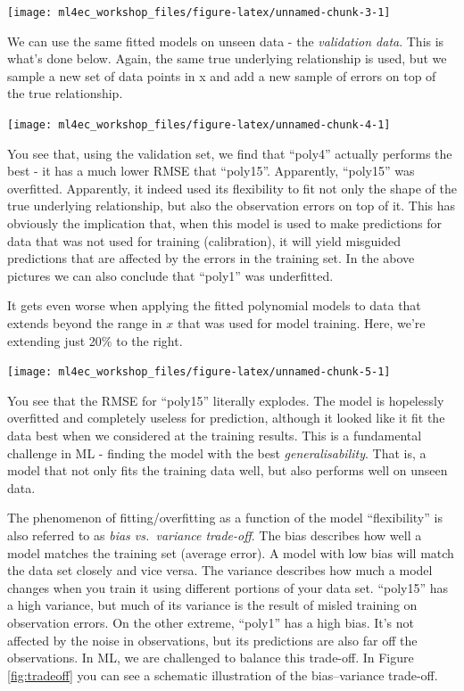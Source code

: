 \documentclass[
]{book}
\begin{document}
\begin{center}\texttt{[image: ml4ec\_workshop\_files/figure-latex/unnamed-chunk-3-1]} \end{center}

We can use the same fitted models on unseen data - the \emph{validation data}. This is what's done below. Again, the same true underlying relationship is used, but we sample a new set of data points in x and add a new sample of errors on top of the true relationship.

\begin{center}\texttt{[image: ml4ec\_workshop\_files/figure-latex/unnamed-chunk-4-1]} \end{center}

You see that, using the validation set, we find that ``poly4'' actually performs the best - it has a much lower RMSE that ``poly15''. Apparently, ``poly15'' was overfitted. Apparently, it indeed used its flexibility to fit not only the shape of the true underlying relationship, but also the observation errors on top of it. This has obviously the implication that, when this model is used to make predictions for data that was not used for training (calibration), it will yield misguided predictions that are affected by the errors in the training set. In the above pictures we can also conclude that ``poly1'' was underfitted.

It gets even worse when applying the fitted polynomial models to data that extends beyond the range in \(x\) that was used for model training. Here, we're extending just 20\% to the right.

\begin{center}\texttt{[image: ml4ec\_workshop\_files/figure-latex/unnamed-chunk-5-1]} \end{center}

You see that the RMSE for ``poly15'' literally explodes. The model is hopelessly overfitted and completely useless for prediction, although it looked like it fit the data best when we considered at the training results. This is a fundamental challenge in ML - finding the model with the best \emph{generalisability}. That is, a model that not only fits the training data well, but also performs well on unseen data.

The phenomenon of fitting/overfitting as a function of the model ``flexibility'' is also referred to as \emph{bias vs.~variance trade-off}. The bias describes how well a model matches the training set (average error). A model with low bias will match the data set closely and vice versa. The variance describes how much a model changes when you train it using different portions of your data set. ``poly15'' has a high variance, but much of its variance is the result of misled training on observation errors. On the other extreme, ``poly1'' has a high bias. It's not affected by the noise in observations, but its predictions are also far off the observations. In ML, we are challenged to balance this trade-off. In Figure \ref{fig:tradeoff} you can see a schematic illustration of the bias--variance trade-off.
\end{document}
